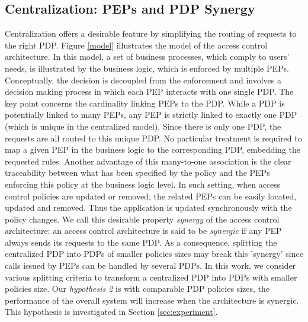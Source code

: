 \subsection{Centralization: PEPs and PDP Synergy}
Centralization offers a desirable feature by simplifying the routing of requests to the right PDP. Figure \ref{model} illustrates the model of 
the access control architecture. In this model, a set of business processes, which comply to users' needs, is illustrated by the business logic, which is 
enforced by multiple PEPs. Conceptually, the decision is decoupled from the enforcement and involves a decision making process in which each PEP interacts 
with one single PDP. The key point concerns the cardinality linking PEPs to the PDP. While a PDP is potentially linked to many PEPs, any PEP is strictly linked to exactly one 
PDP (which is unique in the centralized model). 
Since there is only one PDP, the requests are all routed to this unique PDP. No particular treatment is required to map a given PEP in the business logic to 
the corresponding PDP, embedding the requested rules. Another advantage of this many-to-one association is the clear traceability between what has been specified by the 
policy and the PEPs enforcing this policy at the business logic level. In such setting, 
when access control policies are updated or removed, the related PEPs can be easily located, updated and removed. Thus the application is updated synchronously 
with the policy changes. We call this desirable property \textit{synergy} of the access control architecture: an access control architecture is said to be \textit{synergic} if any PEP always sends 
its requests to the same PDP. 
As a consequence, splitting the centralized PDP into PDPs of smaller policies sizes may break this 'synergy' since calls issued by PEPs can be handled by several PDPs. 
In this work, we consider various splitting criteria to transform a centralized PDP into PDPs with smaller policies size. 
Our \textit{hypothesis 2} is with comparable PDP policies sizes, the performance of the overall system will increase when the architecture is synergic. This hypothesis is investigated in 
Section \ref{sec:experiment}.

